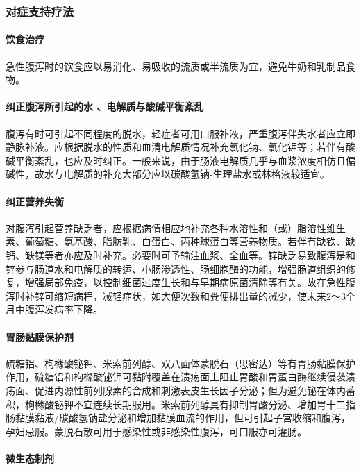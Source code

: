 \subsubsection{对症支持疗法}

\paragraph{饮食治疗}

急性腹泻时的饮食应以易消化、易吸收的流质或半流质为宜，避免牛奶和乳制品食物。

\paragraph{纠正腹泻所引起的水 、电解质与酸碱平衡紊乱}

腹泻有时可引起不同程度的脱水，轻症者可用口服补液，严重腹泻伴失水者应立即静脉补液。应根据脱水的性质和血清电解质情况补充氯化钠、氯化钾等；若伴有酸碱平衡紊乱，也应及时纠正。一般来说，由于肠液电解质几乎与血浆浓度相仿且偏碱性，故水与电解质的补充大部分应以碳酸氢钠-生理盐水或林格液较适宜。

\paragraph{纠正营养失衡}

对腹泻引起营养缺乏者，应根据病情相应地补充各种水溶性和（或）脂溶性维生素、葡萄糖、氨基酸、脂肪乳、白蛋白、丙种球蛋白等营养物质。若伴有缺铁、缺钙、缺镁等者亦应及时补充。必要时可予输注血浆、全血等。锌缺乏易致腹泻是和锌参与肠道水和电解质的转运、小肠渗透性、肠细胞酶的功能，增强肠道组织的修复，增强局部免疫，以控制细菌过度生长和与早期病原菌清除等有关。故在急性腹泻时补锌可缩短病程，减轻症状，如大便次数和粪便排出量的减少，使未来2～3个月中腹泻发病率下降。

\paragraph{胃肠黏膜保护剂}

硫糖铝、枸橼酸铋钾、米索前列醇、双八面体蒙脱石（思密达）等有胃肠黏膜保护作用，硫糖铝和枸橼酸铋钾可黏附覆盖在溃疡面上阻止胃酸和胃蛋白酶继续侵袭溃疡面、促进内源性前列腺素的合成和刺激表皮生长因子分泌；但为避免铋在体内蓄积，枸橼酸铋钾不宜连续长期服用。米索前列醇具有抑制胃酸分泌、增加胃十二指肠黏膜黏液/碳酸氢钠盐分泌和增加黏膜血流的作用，但可引起子宫收缩和腹泻，孕妇忌服。蒙脱石散可用于感染性或非感染性腹泻，可口服亦可灌肠。

\paragraph{微生态制剂}

